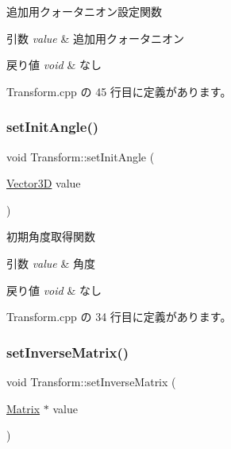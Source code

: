 追加用クォータニオン設定関数 


\begin{DoxyParams}{引数}
{\em value} & 追加用クォータニオン \\
\hline
\end{DoxyParams}

\begin{DoxyRetVals}{戻り値}
{\em void} & なし \\
\hline
\end{DoxyRetVals}


 Transform.\+cpp の 45 行目に定義があります。

\mbox{\label{class_transform_ab64af2387c413b75c26ef343104a56db}} 
\subsubsection{\texorpdfstring{set\+Init\+Angle()}{setInitAngle()}}
{\footnotesize\ttfamily void Transform\+::set\+Init\+Angle (\begin{DoxyParamCaption}\item[{\mbox{\hyperlink{class_vector3_d}{Vector3D}}}]{value }\end{DoxyParamCaption})}



初期角度取得関数 


\begin{DoxyParams}{引数}
{\em value} & 角度 \\
\hline
\end{DoxyParams}

\begin{DoxyRetVals}{戻り値}
{\em void} & なし \\
\hline
\end{DoxyRetVals}


 Transform.\+cpp の 34 行目に定義があります。

\mbox{\label{class_transform_a78b6b021ca4cc1641f934160befb39dd}} 
\subsubsection{\texorpdfstring{set\+Inverse\+Matrix()}{setInverseMatrix()}}
{\footnotesize\ttfamily void Transform\+::set\+Inverse\+Matrix (\begin{DoxyParamCaption}\item[{\mbox{\hyperlink{class_matrix}{Matrix}} $\ast$}]{value }\end{DoxyParamCaption})}




